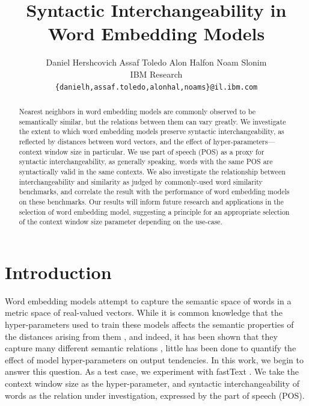 \documentclass[11pt,a4paper]{article}
\title{Syntactic Interchangeability in Word Embedding Models}
\author{
Daniel Hershcovich \qquad Assaf Toledo \qquad Alon Halfon \qquad Noam Slonim \\
IBM Research\\
\texttt{\{danielh,assaf.toledo,alonhal,noams\}@il.ibm.com}
}
\begin{document}
    \maketitle

    \begin{abstract}
    Nearest neighbors in word embedding models are commonly observed to be
    semantically similar, but the relations between them can vary greatly.
    We investigate the extent to which word embedding models
    preserve syntactic interchangeability, as reflected by distances between
    word vectors, and the effect of hyper-parameters---context window size in particular.
    We use part of speech (POS) as a proxy for syntactic interchangeability,
    as generally speaking, words with the same POS are syntactically valid in the same contexts.
    We also investigate the relationship between interchangeability
    and similarity as judged by commonly-used word similarity benchmarks,
    and correlate the result with the performance of word embedding models
    on these benchmarks.
    Our results will inform future research and applications in the selection
    of word embedding model, suggesting a principle for an appropriate selection
    of the context window size parameter depending on the use-case.
    \end{abstract}

    \section{Introduction}\label{sec:introduction}

    Word embedding models \cite{mikolov2013efficient,pennington2014glove,levy2015improving}
    attempt to capture the semantic space of words
    in a metric space of real-valued vectors.
    While it is common knowledge that the hyper-parameters used to train these
    models affects the semantic properties of the distances arising from them
    \cite{goldberg2016primer}, and indeed, it has been shown that
    they capture many different semantic relations \cite{yang2006verb,agirre2009study},
    little has been done to quantify the
    effect of model hyper-parameters on output tendencies.
    In this work, we begin to answer this question.
    As a test case, we experiment with fastText \cite{bojanowski2016enriching}.
    We take the context window size as the hyper-parameter,
    and syntactic interchangeability of words as the relation under investigation,
    expressed by the part of speech (POS).
    
\end{document}
